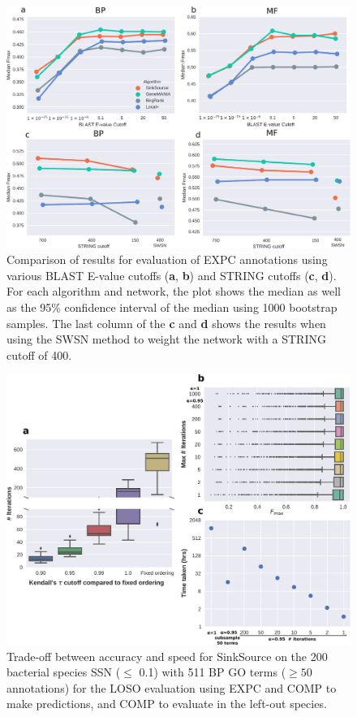 \begin{figure} 
    \centering
    \includegraphics[width=\textwidth]{supp-figs/compare-eval-string-cutoffs-fmax-nobars.pdf}
    \caption{Comparison of \fmax results for \loso evaluation of EXPC annotations using various BLAST E-value cutoffs (\textbf{a}, \textbf{b}) and STRING cutoffs (\textbf{c}, \textbf{d}).
    For each algorithm and network, the plot shows the median \fmax as well as the 95\% confidence interval of the median using 1000 bootstrap samples.
    The last column of the \textbf{c} and \textbf{d} shows the results when using the SWSN method to weight the network with a STRING cutoff of 400.
    }
    \label{sfig:compare-eval-string-cutoffs}
\end{figure}


\begin{figure}
    \centering
    \includegraphics[width=\textwidth]{supp-figs/fig1-s200-expc-comp-rem-neg-iea-comp-bp-a0_95.pdf}
    \caption{Trade-off between accuracy and speed for SinkSource on the 200 bacterial species SSN (\eval $\leq$ 0.1) with 511 BP GO terms ($\geq 50$ annotations) for the LOSO evaluation using EXPC and COMP to make predictions, and COMP to evaluate in the left-out species.}
    \label{fig:my_label}
\end{figure}


